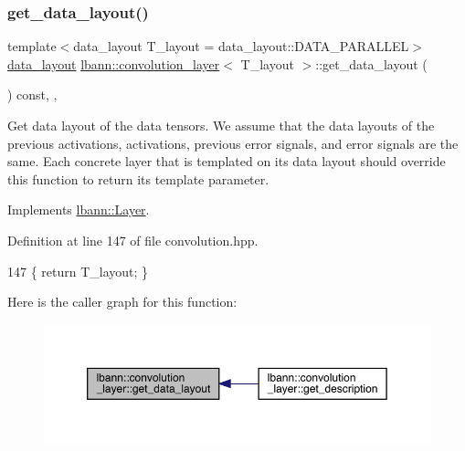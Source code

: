 \subsubsection{\texorpdfstring{get\+\_\+data\+\_\+layout()}{get\_data\_layout()}}
{\footnotesize\ttfamily template$<$data\+\_\+layout T\+\_\+layout = data\+\_\+layout\+::\+D\+A\+T\+A\+\_\+\+P\+A\+R\+A\+L\+L\+EL$>$ \\
\hyperlink{base_8hpp_a786677cbfb3f5677b4d84f3056eb08db}{data\+\_\+layout} \hyperlink{classlbann_1_1convolution__layer}{lbann\+::convolution\+\_\+layer}$<$ T\+\_\+layout $>$\+::get\+\_\+data\+\_\+layout (\begin{DoxyParamCaption}{ }\end{DoxyParamCaption}) const\hspace{0.3cm}{\ttfamily [inline]}, {\ttfamily [override]}, {\ttfamily [virtual]}}

Get data layout of the data tensors. We assume that the data layouts of the previous activations, activations, previous error signals, and error signals are the same. Each concrete layer that is templated on its data layout should override this function to return its template parameter. 

Implements \hyperlink{classlbann_1_1Layer_a5dfb66e81fc085997402a5e2241316bd}{lbann\+::\+Layer}.



Definition at line 147 of file convolution.\+hpp.


\begin{DoxyCode}
147 \{ \textcolor{keywordflow}{return} T\_layout; \}
\end{DoxyCode}
Here is the caller graph for this function\+:\nopagebreak
\begin{figure}[H]
\begin{center}
\leavevmode
\includegraphics[width=350pt]{classlbann_1_1convolution__layer_a496e4bc7465269961603aba305700b84_icgraph}
\end{center}
\end{figure}
\mbox{\label{classlbann_1_1convolution__layer_abce67d7e977d148093798936aff8ee5e}} 
